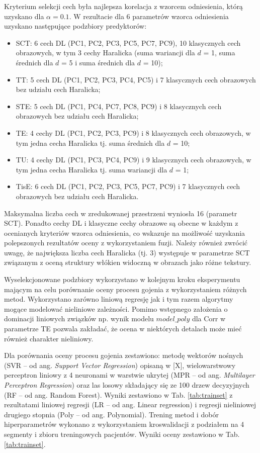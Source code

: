 Kryterium selekcji cech była najlepsza korelacja z wzorcem odniesienia, którą uzyskano dla  $\alpha=0.1$. W rezultacie dla 6 parametrów wzorca odniesienia uzyskano następujące podzbiory predyktorów:  
\begin{itemize}
	\item SCT: 6 cech DL (PC1, PC2, PC3, PC5, PC7, PC9), 10 klasycznych cech obrazowych, w tym 3 cechy Haralicka (suma wariancji dla $d$ = 1, suma średnich dla $d$ = 5 i suma średnich dla $d$ = 10);
	\item TT: 5 cech DL (PC1, PC2, PC3, PC4, PC5) i 7 klasycznych cech obrazowych bez udziału cech Haralicka;
	\item STE: 5 cech DL (PC1, PC4, PC7, PC8, PC9) i 8 klasycznych cech obrazowych bez udziału cech Haralicka;
	\item TE: 4 cechy DL (PC1, PC2, PC3, PC9) i 8 klasycznych cech obrazowych, w tym jedna cecha Haralicka tj. suma średnich dla $d$ = 10;
	\item TU: 4 cechy DL (PC1, PC3, PC4, PC9) i 9 klasycznych cech obrazowych, w tym jedna cecha Haralicka tj. suma wariancji dla $d$ = 1;  
	\item TisE: 6 cech DL (PC1, PC2, PC3, PC5, PC7, PC9) i 7 klasycznych cech obrazowych bez udziału cech Haralicka.
	
\end{itemize}
Maksymalna liczba cech w zredukowanej przestrzeni wyniosła 16 (parametr SCT). Ponadto cechy DL i klasyczne cechy obrazowe są obecne w każdym z ocenianych kryteriów wzorca odniesienia, co wskazuje na możliwość uzyskania polepszonych rezultatów oceny z wykorzystaniem fuzji. Należy również zwrócić uwagę, że największa liczba cech Haralicka (tj. 3) występuje w parametrze SCT związanym z oceną struktury włókien widoczną w obrazach jako różne tekstury.

Wyselekcjonowane podzbiory wykorzystano w kolejnym kroku eksperymentu mającym na celu porównanie oceny procesu gojenia z wykorzystaniem różnych metod. Wykorzystano zarówno liniową regresję jak i tym razem algorytmy mogące modelować nieliniowe zależności. Pomimo wstępnego założenia o dominacji liniowych związków np. wynik modelu $model\_poly$ dla Corr w parametrze TE pozwala zakładać, że ocena w niektórych detalach może mieć również charakter nieliniowy. 

Dla porównania oceny procesu gojenia zestawiono: metodę wektorów nośnych (SVR -- od ang. \textit{Support Vector Regression}) opisaną w [X], wielowarstwowy perceptron liniowy z 4 neuronami w warstwie ukrytej (MPR -- od ang. \textit{Multilayer Perceptron Regression}) oraz las losowy składający się ze 100 drzew decyzyjnych (RF -- od ang. Random Forest). Wyniki zestawiono w Tab. \ref{tab:trainset} z rezultatami liniowej regresji (LR -- od ang. Linear regression) i regresji nieliniowej drugiego stopnia (Poly -- od ang. Polynomial). Trening metod i dobór hiperparametrów wykonano z wykorzystaniem kroswalidacji z podziałem na 4 segmenty i zbioru treningowych pacjentów. Wyniki oceny zestawiono w Tab. \ref{tab:trainset}.

